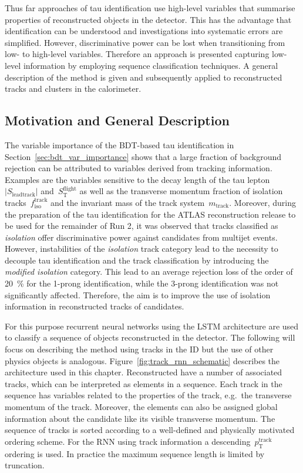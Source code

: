 Thus far approaches of tau identification use high-level variables that
summarise properties of reconstructed objects in the detector. This has the
advantage that identification can be understood and investigations into
systematic errors are simplified. However, discriminative power can be lost when
transitioning from low- to high-level variables. Therefore an approach is
presented capturing low-level information by employing sequence classification
techniques. A general description of the method is given and subsequently
applied to reconstructed tracks and clusters in the calorimeter.

\subsection{Motivation and General Description}
\label{sec:rnn_descr}

The variable importance of the BDT-based tau identification in
Section~\ref{sec:bdt_var_importance} shows that a large fraction of background
rejection can be attributed to variables derived from tracking information.
Examples are the variables sensitive to the decay length of the tau
lepton~$|S_\text{leadtrack}|$ and~$S_\text{T}^\text{flight}$ as well as the
transverse momentum fraction of isolation tracks~$f_\text{iso}^\text{track}$ and
the invariant mass of the track system~$m_\text{track}$. Moreover, during the
preparation of the tau identification for the ATLAS reconstruction release to be
used for the remainder of Run 2, it was observed that tracks classified as
\emph{isolation} offer discriminative power against \tauhadvis candidates from
multijet events. However, instabilities of the \emph{isolation} track category
lead to the necessity to decouple tau identification and the track
classification by introducing the \emph{modified isolation} category. This lead
to an average rejection loss of the order of \SI{20}{\percent} for the 1-prong
identification, while the 3-prong identification was not significantly affected.
Therefore, the aim is to improve the use of isolation information in
reconstructed tracks of \tauhadvis candidates.

For this purpose recurrent neural networks using the LSTM architecture are used
to classify a sequence of objects reconstructed in the detector. The following
will focus on describing the method using tracks in the ID but the use of other
physics objects is analogous. Figure~\ref{fig:track_rnn_schematic} describes the
architecture used in this chapter. Reconstructed \tauhadvis have a number of
associated tracks, which can be interpreted as elements in a sequence. Each
track in the sequence has variables related to the properties of the track,
e.g.\ the transverse momentum of the track. Moreover, the elements can also be
assigned global information about the \tauhadvis candidate like its visible
transverse momentum. The sequence of tracks is sorted according to a
well-defined and physically motivated ordering scheme. For the RNN using track
information a descending~$p_\text{T}^\text{track}$ ordering is used.  In practice the maximum sequence length is limited by
truncation.

